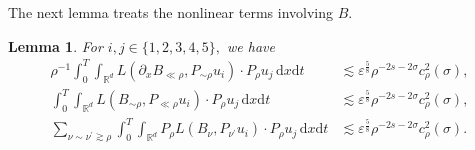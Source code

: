\documentclass[11pt,letterpaper,reqno]{amsart}
\numberwithin{equation}{section}
\newtheorem{lemma}[theorem]{Lemma}
\theoremstyle{definition}
\theoremstyle{remark}
\begin{document}
The next lemma treats the nonlinear terms involving $B$.
\begin{lemma}
For \(i,j\in\{1,2,3,4,5\},\) we have
\begin{align}
     \rho^{-1} \int_0^T \int_{\mathbb{R}^{d}}    L(  \partial_xB_{\ll \rho }, P_{\sim\rho } u_i ) \cdot   P_{\rho} u_j  \,\mathrm{ d} x \mathrm{ d} t& \lesssim \varepsilon^{\frac58}\rho ^{-2s-2\sigma}c_{\rho }^2 (\sigma),
 \label{est_EnBt1}\\
	    \int_0^T \int_{\mathbb{R}^{d}}    L( B_{ \sim \rho }, P_{\ll \rho  } u_i )\cdot P_{\rho} u_j  \,\mathrm{ d} x \mathrm{ d} t &\lesssim\varepsilon^{\frac58}\rho ^{-2s-2\sigma}c_{\rho }^2 (\sigma),\label{est_EnBt2}\\
	 \sum_{\nu\sim \nu^\prime\gtrsim \rho }   \int_0^T \int_{\mathbb{R}^{d}}  P_\rho L(B_{ \nu},P_{\nu^\prime }u_i)\cdot P_{\rho} u_j \, \mathrm{ d} x \mathrm{ d} t &\lesssim \varepsilon^{\frac58}\rho ^{-2s-2\sigma}c_{\rho }^2 (\sigma). \label{est_EnBt3}
\end{align}
\end{lemma}
\end{document}
